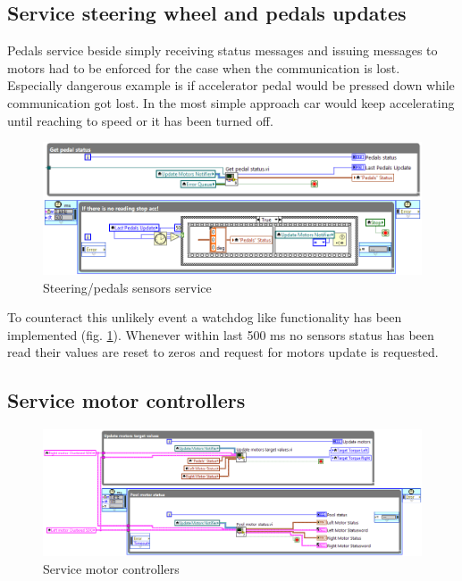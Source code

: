 \subsection{Service steering wheel and pedals updates}
Pedals service beside simply receiving status messages and issuing messages to motors had to be enforced for the case when the communication is lost. Especially dangerous example is if accelerator pedal would be pressed down while communication got lost.
In the most simple approach car would keep accelerating until reaching to speed or it has been turned off.
\begin{figure}[H]
    \centering
    \includegraphics[width=\textwidth]{figures/Pedals_status}
    \caption{Steering/pedals sensors service}
    \label{pedals_service}
\end{figure}
To counteract this unlikely event a watchdog like functionality has been implemented (fig. \ref{pedals_service}). Whenever within last 500 ms no sensors status has been read their values are reset to zeros and request for motors update is requested.

\subsection{Service motor controllers}
\begin{figure}[H]
    \centering
    \includegraphics[width=\textwidth]{figures/Run_maind1_e}
    \caption{Service motor controllers}
    \label{s_m_c}
\end{figure}
